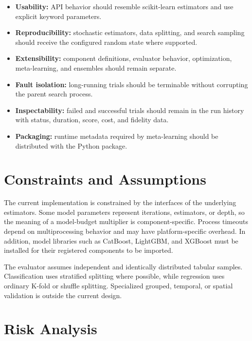 \documentclass[12pt,a4paper,oneside]{report}
\begin{document}
\begin{itemize}[leftmargin=*]
  \item \textbf{Usability:} API behavior should resemble scikit-learn
        estimators and use explicit keyword parameters.
  \item \textbf{Reproducibility:} stochastic estimators, data splitting, and
        search sampling should receive the configured random state where
        supported.
  \item \textbf{Extensibility:} component definitions, evaluator behavior,
        optimization, meta-learning, and ensembles should remain separate.
  \item \textbf{Fault isolation:} long-running trials should be terminable
        without corrupting the parent search process.
  \item \textbf{Inspectability:} failed and successful trials should remain in
        the run history with status, duration, score, cost, and fidelity data.
  \item \textbf{Packaging:} runtime metadata required by meta-learning should
        be distributed with the Python package.
\end{itemize}

\section{Constraints and Assumptions}

The current implementation is constrained by the interfaces of the underlying
estimators. Some model parameters represent iterations, estimators, or depth,
so the meaning of a model-budget multiplier is component-specific. Process
timeouts depend on multiprocessing behavior and may have platform-specific
overhead. In addition, model libraries such as CatBoost, LightGBM, and XGBoost
must be installed for their registered components to be imported.

\medskip

\noindent The evaluator assumes independent and identically distributed tabular samples.
Classification uses stratified splitting where possible, while regression uses
ordinary K-fold or shuffle splitting. Specialized grouped, temporal, or spatial
validation is outside the current design.

\section{Risk Analysis}
\end{document}
